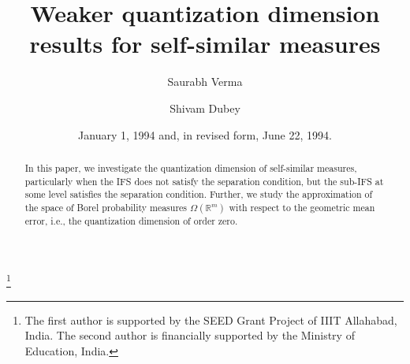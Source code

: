 \documentclass{amsproc}
\theoremstyle{definition}
\theoremstyle{remark}
\numberwithin{equation}{section}
\begin{document}
\title[Weaker quantization dimension results for self-similar measures]{Weaker quantization dimension results for self-similar measures}




\author{Saurabh Verma}
\address{Department of Applied Sciences, IIIT Allahabad, Prayagraj, India 211015}
\thanks{The first author is supported by the SEED Grant Project of IIIT Allahabad, India. The second author is financially supported by the Ministry of Education, India.}

\author{Shivam Dubey}
\address{Department of Applied Sciences, IIIT Allahabad, Prayagraj, India 211015}
%





\date{January 1, 1994 and, in revised form, June 22, 1994.}



\begin{abstract}
In this paper, we investigate the quantization dimension of self-similar measures, particularly when the IFS does not satisfy the separation condition, but the sub-IFS at some level satisfies the separation condition. Further, we study the approximation of the space of Borel probability measures $\Omega(\mathbb{R}^m)$ with respect to the geometric mean error, i.e., the quantization dimension of order zero.

\end{abstract}

\maketitle
\end{document}
